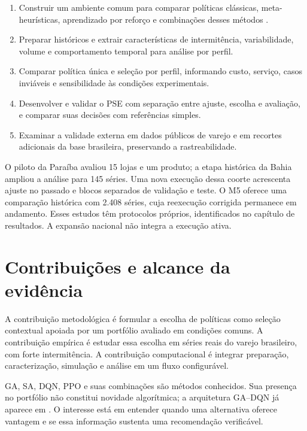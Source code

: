 \begin{enumerate}
  \item Construir um ambiente comum para comparar políticas clássicas, meta-heurísticas, aprendizado por reforço e combinações desses métodos \citep{Law2015SimulationModeling,Talbi2009Metaheuristics}.
  \item Preparar históricos e extrair características de intermitência, variabilidade, volume e comportamento temporal para análise por perfil.
  \item Comparar política única e seleção por perfil, informando custo, serviço, casos inviáveis e sensibilidade às condições experimentais.
  \item Desenvolver e validar o PSE com separação entre ajuste, escolha e avaliação, e comparar suas decisões com referências simples.
  \item Examinar a validade externa em dados públicos de varejo e em recortes adicionais da base brasileira, preservando a rastreabilidade.
\end{enumerate}

O piloto da Paraíba avaliou 15 lojas e um produto; a etapa histórica da Bahia ampliou a análise para 145 séries. Uma nova execução dessa coorte acrescenta ajuste no passado e blocos separados de validação e teste. O M5 oferece uma comparação histórica com 2.408 séries, cuja reexecução corrigida permanece em andamento. Esses estudos têm protocolos próprios, identificados no capítulo de resultados. A expansão nacional não integra a execução ativa.

\section{Contribuições e alcance da evidência}

A contribuição metodológica é formular a escolha de políticas como seleção contextual apoiada por um portfólio avaliado em condições comuns. A contribuição empírica é estudar essa escolha em séries reais do varejo brasileiro, com forte intermitência. A contribuição computacional é integrar preparação, caracterização, simulação e análise em um fluxo configurável.

GA, SA, DQN, PPO e suas combinações são métodos conhecidos. Sua presença no portfólio não constitui novidade algorítmica; a arquitetura GA--DQN já aparece em \citet{Zabraoui2025GaDQN}. O interesse está em entender quando uma alternativa oferece vantagem e se essa informação sustenta uma recomendação verificável.


